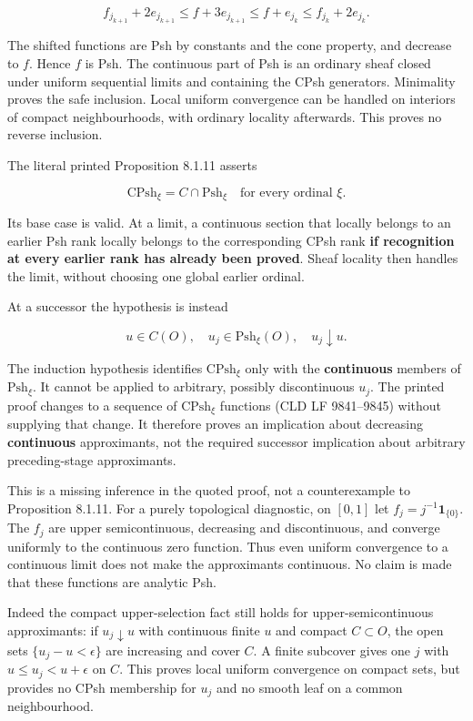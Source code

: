 \documentclass[
  11pt,
]{article}
\begin{document}
\[
f_{j_{k+1}}+2e_{j_{k+1}}
\leq f+3e_{j_{k+1}}
\leq f+e_{j_k}
\leq f_{j_k}+2e_{j_k}.
\]

The shifted functions are Psh by constants and the cone property, and
decrease to \(f\). Hence \(f\) is Psh. The continuous part of Psh is an
ordinary sheaf closed under uniform sequential limits and containing the
CPsh generators. Minimality proves the safe inclusion. Local uniform
convergence can be handled on interiors of compact neighbourhoods, with
ordinary locality afterwards. This proves no reverse inclusion.

The literal printed Proposition 8.1.11 asserts

\[\mathrm{CPsh}_\xi=C\cap\mathrm{Psh}_\xi\quad\text{for every ordinal }\xi.\]

Its base case is valid. At a limit, a continuous section that locally
belongs to an earlier Psh rank locally belongs to the corresponding CPsh
rank \textbf{if recognition at every earlier rank has already been
proved}. Sheaf locality then handles the limit, without choosing one
global earlier ordinal.

At a successor the hypothesis is instead

\[u\in C(O),\quad u_j\in\mathrm{Psh}_\xi(O),\quad u_j\downarrow u.\]

The induction hypothesis identifies \(\mathrm{CPsh}_\xi\) only with the
\textbf{continuous} members of \(\mathrm{Psh}_\xi\). It cannot be
applied to arbitrary, possibly discontinuous \(u_j\). The printed proof
changes to a sequence of \(\mathrm{CPsh}_\xi\) functions (CLD LF
9841--9845) without supplying that change. It therefore proves an
implication about decreasing \textbf{continuous} approximants, not the
required successor implication about arbitrary preceding-stage
approximants.

This is a missing inference in the quoted proof, not a counterexample to
Proposition 8.1.11. For a purely topological diagnostic, on \([0,1]\)
let \(f_j=j^{-1}\mathbf1_{\{0\}}\). The \(f_j\) are upper
semicontinuous, decreasing and discontinuous, and converge uniformly to
the continuous zero function. Thus even uniform convergence to a
continuous limit does not make the approximants continuous. No claim is
made that these functions are analytic Psh.

Indeed the compact upper-selection fact still holds for
upper-semicontinuous approximants: if \(u_j\downarrow u\) with
continuous finite \(u\) and compact \(C\subset O\), the open sets
\(\{u_j-u<\epsilon\}\) are increasing and cover \(C\). A finite subcover
gives one \(j\) with \(u\leq u_j<u+\epsilon\) on \(C\). This proves
local uniform convergence on compact sets, but provides no CPsh
membership for \(u_j\) and no smooth leaf on a common neighbourhood.
\end{document}

